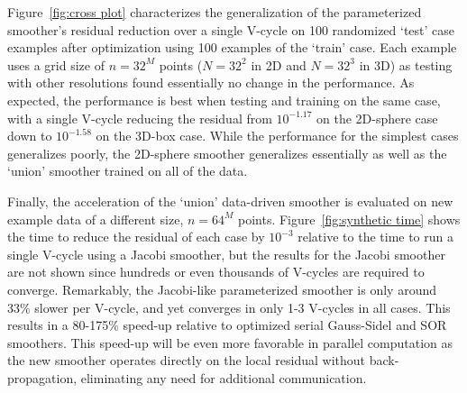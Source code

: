 \documentclass[review]{elsarticle}
\begin{document}
Figure~\ref{fig:cross plot} characterizes the generalization of the parameterized smoother's residual reduction over a single V-cycle on 100 randomized `test' case examples after optimization using 100 examples of the `train' case. Each example uses a grid size of $n=32^M$ points ($N=32^2$ in 2D and $N=32^3$ in 3D) as testing with other resolutions found essentially no change in the performance. As expected, the performance is best when testing and training on the same case, with a single V-cycle reducing the residual from $10^{-1.17}$ on the 2D-sphere case down to $10^{-1.58}$ on the 3D-box case. While the performance for the simplest cases generalizes poorly, the 2D-sphere smoother generalizes essentially as well as the `union' smoother trained on all of the data. 

Finally, the acceleration of the `union' data-driven smoother is evaluated on new example data of a different size, $n=64^M$ points. Figure~\ref{fig:synthetic time} shows the time to reduce the residual of each case by $10^{-3}$ relative to the time to run a single V-cycle using a Jacobi smoother, but the results for the Jacobi smoother are not shown since hundreds or even thousands of V-cycles are required to converge. Remarkably, the Jacobi-like parameterized smoother is only around 33\% slower per V-cycle, and yet converges in only 1-3 V-cycles in all cases. This results in a 80-175\% speed-up relative to optimized serial Gauss-Sidel and SOR smoothers. This speed-up will be even more favorable in parallel computation as the new smoother operates directly on the local residual without back-propagation, eliminating any need for additional communication.
\end{document}
